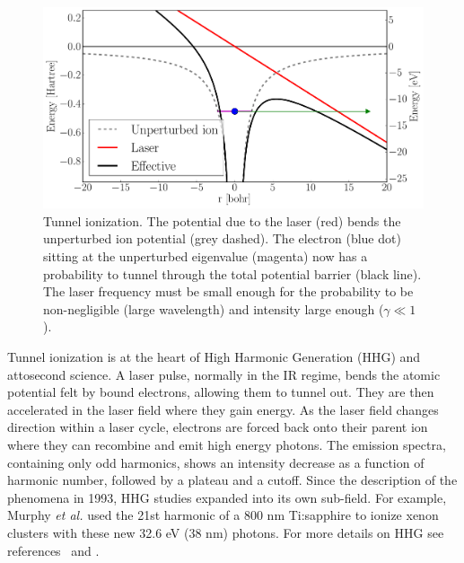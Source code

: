 \begin{figure}
 \centering
 \includegraphics[width=\figurewidth]{figures/ionization_tunnel}
 \caption{\label{fig:ionization:tunnel}Tunnel ionization. The potential
          due to the laser (red) bends the unperturbed ion potential
          (grey dashed). The electron (blue dot) sitting at the unperturbed
          eigenvalue (magenta) now has a probability to tunnel through the total
          potential barrier (black line). The laser frequency must be small
          enough for the probability to be non-negligible (large wavelength)
          and intensity large enough ($\gamma \ll 1$).}
\end{figure}

Tunnel ionization is at the heart of High Harmonic Generation (HHG) and
attosecond science\cite{Fennel2010}. A laser pulse, normally in the IR regime,
bends the atomic potential felt by bound electrons, allowing them to tunnel
out. They are then accelerated in the laser field where they gain energy.
As the laser field changes direction within a laser cycle, electrons are forced
back onto their parent ion where they can
recombine and emit high energy photons. The emission spectra,
containing only odd harmonics, shows an intensity decrease as a function of
harmonic number, followed by a plateau and a cutoff. Since the description
of the phenomena in 1993\cite{Corkum1993}, HHG studies expanded into its own
sub-field. For example, Murphy \textit{et al.} used the 21st harmonic of a
800 nm Ti:sapphire to ionize xenon clusters\cite{Murphy2008a,Murphy2008b}
with these new 32.6 eV (38 nm) photons.
For more details on HHG see references~\cite{Levesque2006} and
\cite{Lewenstein2008}.


